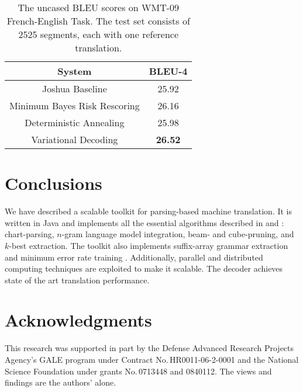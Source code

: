 \documentclass[11pt]{article}
\begin{document}
\begin{table}[t]
\begin{center}
\begin{tabular}{c c}\hline
System & BLEU-4 \\ \hline
Joshua Baseline & 25.92 \\
Minimum Bayes Risk Rescoring & 26.16 \\
Deterministic Annealing & 25.98 \\
Variational Decoding & {\bf 26.52} \\ \hline
\end{tabular}
\end{center}
\caption{The uncased BLEU scores on WMT-09 French-English Task.  The test set consists of 2525 segments, each with one reference translation.}
\label{results-wmt09}
\end{table}

\section{Conclusions}

We have described a scalable toolkit for parsing-based machine translation. It is written in Java and implements all the essential algorithms described in  and : chart-parsing, $n$-gram language model integration, beam- and cube-pruning, and $k$-best extraction.
The toolkit also implements suffix-array grammar extraction \cite{Callison-Burch2005b,Lopez2007} and minimum error rate training \cite{Och2003c}. Additionally, parallel and distributed computing techniques are exploited to make it scalable. The decoder achieves state of the art translation performance.





\section*{Acknowledgments}
This research was supported in part by the Defense Advanced Research Projects Agency's GALE program under Contract No.\,HR0011-06-2-0001 and the National Science Foundation under grants No.\,0713448 and 0840112. The views and findings are the authors' alone.




\end{document}

